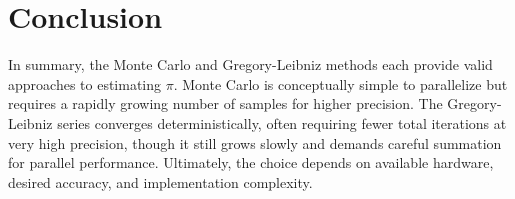 \documentclass[12pt]{article}
\begin{document}
\section*{Conclusion}
In summary, the Monte Carlo and Gregory-Leibniz methods each provide valid
approaches to estimating \(\pi\). Monte Carlo is conceptually simple to parallelize
but requires a rapidly growing number of samples for higher precision. The
Gregory-Leibniz series converges deterministically, often requiring fewer total
iterations at very high precision, though it still grows slowly and demands
careful summation for parallel performance. Ultimately, the choice depends on
available hardware, desired accuracy, and implementation complexity.
\end{document}
